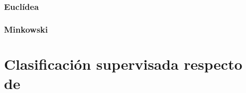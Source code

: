 \documentclass[10pt,a4paper]{article}
\begin{document}
\subsubsection{Euclídea}

\subsubsection{Minkowski}

\section{Clasificación supervisada respecto de }

%
%
%
%
%
%
%
%
%
\end{document}
